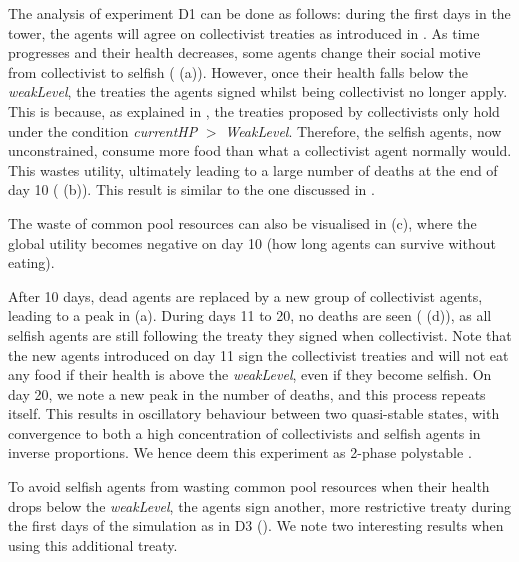 The analysis of experiment D1 can be done as follows: during the first days in the tower, the agents will agree on collectivist treaties as introduced in . As time progresses and their health decreases, some agents change their social motive from collectivist to selfish ( (a)). However, once their health falls below the \textit{weakLevel}, the treaties the agents signed whilst being collectivist no longer apply. This is because, as explained in , the treaties proposed by collectivists only hold under the condition \textit{currentHP} $>$ \textit{WeakLevel}. Therefore, the selfish agents, now unconstrained, consume more food than what a collectivist agent normally would. This wastes utility, ultimately leading to a large number of deaths at the end of day 10 ( (b)). This result is similar to the one discussed in .

The waste of common pool resources can also be visualised in  (c), where the global utility becomes negative on day 10 (how long agents can survive without eating).

After 10 days, dead agents are replaced by a new group of collectivist agents, leading to a peak in  (a). During days 11 to 20, no deaths are seen ( (d)), as all selfish agents are still following the treaty they signed when collectivist. Note that the new agents introduced on day 11 sign the collectivist treaties and will not eat any food if their health is above the \textit{weakLevel}, even if they become selfish. On day 20, we note a new peak in the number of deaths, and this process repeats itself. This results in oscillatory behaviour between two quasi-stable states, with convergence to both a high concentration of collectivists and selfish agents in inverse proportions. We hence deem this experiment as 2-phase polystable \cite{ashby2015design}.



To avoid selfish agents from wasting common pool resources when their health drops below the \textit{weakLevel}, the agents sign another, more restrictive treaty during the first days of the simulation as in D3 (). We note two interesting results when using this additional treaty.


